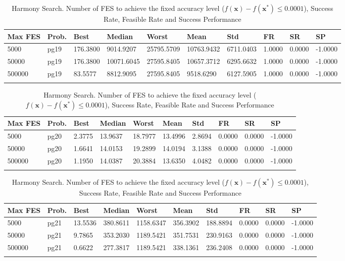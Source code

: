 \documentclass[10pt, a4paper]{book}
\begin{document}
\begin{center}
\begin{longtable}{l l l l l l l l l l}
\textbf{Max FES} & \textbf{Prob.} & \textbf{Best} & \textbf{Median} & \textbf{Worst} & \textbf{Mean} & \textbf{Std} & \textbf{FR} & \textbf{SR} & \textbf{SP} \\
\hline
5000 & pg19 & 176.3800 & 9014.9207 & 25795.5709 & 10763.9432 & 6711.0403 & 1.0000 & 0.0000 & -1.0000 \\
50000 & pg19 & 176.3800 & 10071.6045 & 27595.8405 & 10657.3712 & 6295.6632 & 1.0000 & 0.0000 & -1.0000 \\
500000 & pg19 & 83.5577 & 8812.9095 & 27595.8405 & 9518.6290 & 6127.5905 & 1.0000 & 0.0000 & -1.0000 \\

\caption{ Harmony Search. Number of FES to achieve the fixed accuracy level ($f(\mathbf{x}) - f(\mathbf{x}^{*}) \leq 0.0001$), Success Rate, Feasible Rate and Success Performance }
\end{longtable}
\end{center}

\begin{center}
\begin{longtable}{l l l l l l l l l l}
\textbf{Max FES} & \textbf{Prob.} & \textbf{Best} & \textbf{Median} & \textbf{Worst} & \textbf{Mean} & \textbf{Std} & \textbf{FR} & \textbf{SR} & \textbf{SP} \\
\hline
5000 & pg20 & 2.3775 & 13.9637 & 18.7977 & 13.4996 & 2.8694 & 0.0000 & 0.0000 & -1.0000 \\
50000 & pg20 & 1.6641 & 14.0153 & 19.2899 & 14.0194 & 3.1388 & 0.0000 & 0.0000 & -1.0000 \\
500000 & pg20 & 1.1950 & 14.0387 & 20.3884 & 13.6350 & 4.0482 & 0.0000 & 0.0000 & -1.0000 \\

\caption{ Harmony Search. Number of FES to achieve the fixed accuracy level ($f(\mathbf{x}) - f(\mathbf{x}^{*}) \leq 0.0001$), Success Rate, Feasible Rate and Success Performance }
\end{longtable}
\end{center}

\begin{center}
\begin{longtable}{l l l l l l l l l l}
\textbf{Max FES} & \textbf{Prob.} & \textbf{Best} & \textbf{Median} & \textbf{Worst} & \textbf{Mean} & \textbf{Std} & \textbf{FR} & \textbf{SR} & \textbf{SP} \\
\hline
5000 & pg21 & 13.5536 & 380.8611 & 1158.6347 & 356.3902 & 188.8894 & 0.0000 & 0.0000 & -1.0000 \\
50000 & pg21 & 9.7865 & 353.2030 & 1189.5421 & 351.7531 & 230.9163 & 0.0000 & 0.0000 & -1.0000 \\
500000 & pg21 & 0.6622 & 277.3817 & 1189.5421 & 338.1361 & 236.2408 & 0.0000 & 0.0000 & -1.0000 \\

\caption{ Harmony Search. Number of FES to achieve the fixed accuracy level ($f(\mathbf{x}) - f(\mathbf{x}^{*}) \leq 0.0001$), Success Rate, Feasible Rate and Success Performance }
\end{longtable}
\end{center}
\end{document}

